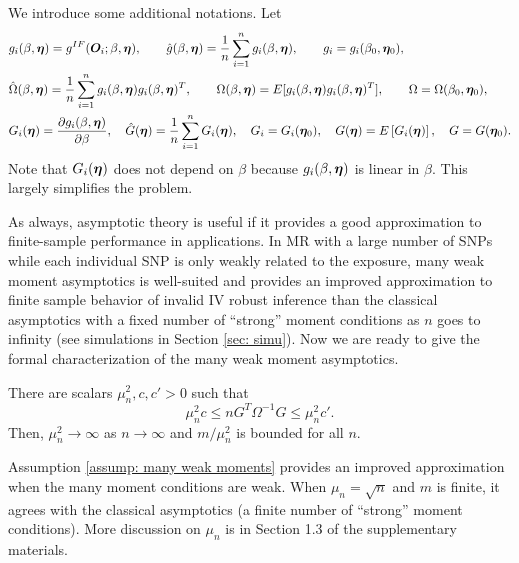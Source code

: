 \documentclass[12pt]{article}
\begin{document}
We introduce some additional notations. Let 
\begin{align}
	& g_i({ \beta}, \bm \eta)= g^{IF}(\bm O_i; { \beta}, \bm \eta) ,  \qquad \hat{g}({ \beta}, \bm \eta)=\frac{1}{n} \sum_{i=1}^{n} g_i ({ \beta}, \bm \eta), \qquad g_i=g_i({ \beta}_0, \bm \eta_0), \nonumber\\
	& \hat{\Omega}({ \beta}, \bm \eta)=  \frac{1}{n} \sum_{i=1}^{n} g_i({ \beta},\bm \eta) g_i({ \beta}, \bm \eta)^T, \qquad \Omega({ \beta}, \bm \eta) = E[ g_i({ \beta}, \bm \eta) g_i({ \beta}, \bm \eta)^T] , \qquad \Omega= \Omega({ \beta}_0, \bm \eta_0),\nonumber\\
	& G_i( \bm \eta)= \frac{\partial g_i({ \beta}, \bm \eta)}{\partial { \beta}},\quad  \hat G(\bm \eta)= \frac1n \sum_{i=1}^{n}G_i(\bm \eta), \quad G_i= G_i( \bm \eta_0), \quad G( \bm \eta)= E\left[ G_i( \bm \eta)\right], \quad G= G(\bm \eta_0). \nonumber 
\end{align}
Note that $ G_i(\bm \eta) $ does not depend on $ \beta $ because $ g_i(\beta, \bm \eta) $ is linear in $ \beta $. This largely simplifies the problem. 

As always, asymptotic theory is useful if it provides a good approximation to finite-sample performance in applications. In MR with a large number of SNPs while each individual SNP is only weakly related to the exposure,  many weak moment asymptotics is well-suited and provides an improved approximation to finite sample behavior of invalid IV robust  inference than the classical asymptotics with a fixed number of ``strong'' moment conditions as $ n $ goes to infinity (see simulations in Section \ref{sec: simu}). Now we are ready to give the formal characterization of the many weak moment asymptotics.  





\begin{assum} \label{assump: many weak moments}
	There are scalars $ \! \mu_n^2, c, \! c'>0$ such that 
	$$ 
	\mu_n^{2} c\leq  n G^T \Omega^{-1}  G \leq 	\mu_n^{2} c'.
	$$
	Then, $\mu_n^2\rightarrow \infty $ as $n\to \infty$ and $ m/\mu_n^2 $ is bounded for all $n$. 
\end{assum}
Assumption \ref{assump: many weak moments} provides an improved approximation when the many moment conditions are weak.  When $ \mu_n=\! \sqrt{n} $ and $m$ is finite, it agrees with the classical asymptotics (a finite number of ``strong'' moment conditions). More discussion on $ \mu_n $ is in Section 1.3 of the supplementary materials.
\end{document}
